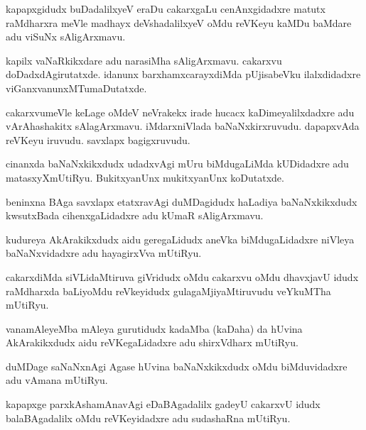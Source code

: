 \documentclass{article}
\begin{document}
\begin{mn}%
kapapxgidudx buDadalilxyeV eraDu cakarxgaLu cenAnxgidadxre matutx raMdharxra meVle madhayx 
deVshadalilxyeV oMdu reVKeyu kaMDu baMdare adu viSuNx sAligArxmavu.
\end{mn}

\begin{mn}%
kapilx vaNaRkikxdare adu narasiMha sAligArxmavu. cakarxvu doDadxdAgirutatxde. idanunx 
barxhamxcarayxdiMda pUjisabeVku ilalxdidadxre viGanxvanunxMTumaDutatxde.
\end{mn}

\begin{mn}%
cakarxvumeVle keLage oMdeV neVrakekx irade hucacx kaDimeyalilxdadxre adu vArAhashakitx 
sAlagArxmavu. iMdarxniVlada baNaNxkirxruvudu. dapapxvAda reVKeyu iruvudu. savxlapx bagigxruvudu.
\end{mn}

\begin{mn}%
cinanxda baNaNxkikxdudx udadxvAgi mUru biMdugaLiMda kUDidadxre adu matasxyXmUtiRyu. BukitxyanUnx 
mukitxyanUnx koDutatxde.
\end{mn}

\begin{mn}%
beninxna BAga savxlapx etatxravAgi duMDagidudx haLadiya baNaNxkikxdudx kwsutxBada cihenxgaLidadxre 
adu kUmaR sAligArxmavu.
\end{mn}

\begin{mn}%
kudureya AkArakikxdudx aidu geregaLidudx aneVka biMdugaLidadxre niVleya baNaNxvidadxre adu 
hayagirxVva mUtiRyu.
\end{mn}

\begin{mn}%
cakarxdiMda siVLidaMtiruva giVridudx oMdu cakarxvu oMdu dhavxjavU idudx raMdharxda baLiyoMdu 
reVkeyidudx gulagaMjiyaMtiruvudu veYkuMTha mUtiRyu.
\end{mn}

\begin{mn}%
vanamAleyeMba mAleya gurutidudx kadaMba (kaDaha) da hUvina AkArakikxdudx aidu reVKegaLidadxre adu 
shirxVdharx mUtiRyu.
\end{mn}

\begin{mn}%
duMDage saNaNxnAgi Agase hUvina baNaNxkikxdudx oMdu biMduvidadxre adu vAmana mUtiRyu.
\end{mn}

\begin{mn}%
kapapxge parxkAshamAnavAgi eDaBAgadalilx gadeyU cakarxvU idudx balaBAgadalilx oMdu reVKeyidadxre 
adu sudashaRna mUtiRyu.
\end{mn}
\end{document}
